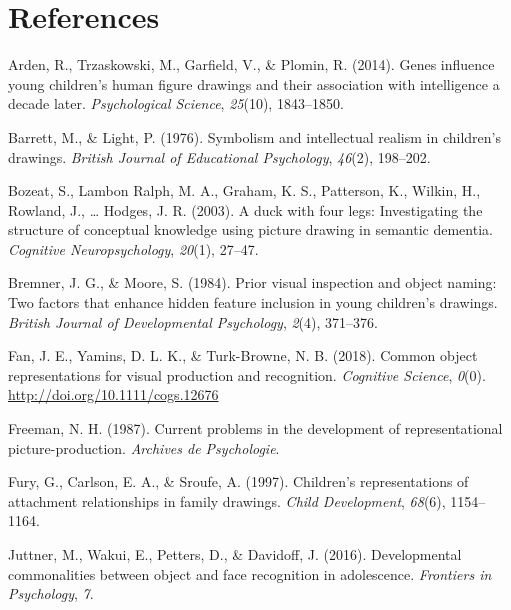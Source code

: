\documentclass[10pt, letterpaper]{article}
\begin{document}
\section{References}\label{references}

\setlength{\parindent}{-0.1in} \setlength{\leftskip}{0.125in} \noindent

\hypertarget{refs}{}
\hypertarget{ref-arden2014genes}{}
Arden, R., Trzaskowski, M., Garfield, V., \& Plomin, R. (2014). Genes
influence young children's human figure drawings and their association
with intelligence a decade later. \emph{Psychological Science},
\emph{25}(10), 1843--1850.

\hypertarget{ref-barrett1976symbolism}{}
Barrett, M., \& Light, P. (1976). Symbolism and intellectual realism in
children's drawings. \emph{British Journal of Educational Psychology},
\emph{46}(2), 198--202.

\hypertarget{ref-bozeat2003duck}{}
Bozeat, S., Lambon Ralph, M. A., Graham, K. S., Patterson, K., Wilkin,
H., Rowland, J., \ldots{} Hodges, J. R. (2003). A duck with four legs:
Investigating the structure of conceptual knowledge using picture
drawing in semantic dementia. \emph{Cognitive Neuropsychology},
\emph{20}(1), 27--47.

\hypertarget{ref-bremmer1984prior}{}
Bremner, J. G., \& Moore, S. (1984). Prior visual inspection and object
naming: Two factors that enhance hidden feature inclusion in young
children's drawings. \emph{British Journal of Developmental Psychology},
\emph{2}(4), 371--376.

\hypertarget{ref-FanCommon2018}{}
Fan, J. E., Yamins, D. L. K., \& Turk-Browne, N. B. (2018). Common
object representations for visual production and recognition.
\emph{Cognitive Science}, \emph{0}(0).
\url{http://doi.org/10.1111/cogs.12676}

\hypertarget{ref-freeman1987current}{}
Freeman, N. H. (1987). Current problems in the development of
representational picture-production. \emph{Archives de Psychologie}.

\hypertarget{ref-fury1997children}{}
Fury, G., Carlson, E. A., \& Sroufe, A. (1997). Children's
representations of attachment relationships in family drawings.
\emph{Child Development}, \emph{68}(6), 1154--1164.

\hypertarget{ref-juttner2016developmental}{}
Juttner, M., Wakui, E., Petters, D., \& Davidoff, J. (2016).
Developmental commonalities between object and face recognition in
adolescence. \emph{Frontiers in Psychology}, \emph{7}.
\end{document}
